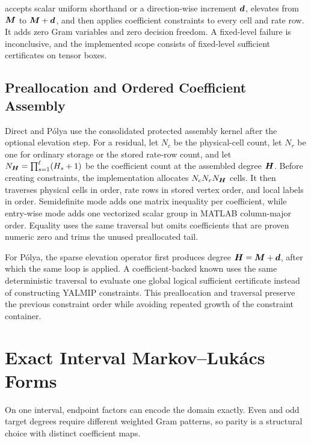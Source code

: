  accepts scalar uniform shorthand or a direction-wise increment $\boldsymbol{d}$, elevates from $\boldsymbol{M}$ to $\boldsymbol{M}+\boldsymbol{d}$, and then applies coefficient constraints to every cell and rate row. It adds zero Gram variables and zero decision freedom. A fixed-level failure is inconclusive, and the implemented scope consists of fixed-level sufficient certificates on tensor boxes.

\subsection{Preallocation and Ordered Coefficient Assembly}

Direct and P\'olya use the consolidated protected  assembly kernel after the optional elevation step. For a  residual, let $N_c$ be the physical-cell count, let $N_r$ be one for ordinary storage or the stored rate-row count, and let $N_{\boldsymbol{H}}=\prod_{s=1}^{\ell}(H_s+1)$ be the coefficient count at the assembled degree $\boldsymbol{H}$. Before creating constraints, the implementation allocates $N_cN_rN_{\boldsymbol{H}}$ cells. It then traverses physical cells in  order, rate rows in stored vertex order, and local labels in  order. Semidefinite mode adds one matrix inequality per coefficient, while entry-wise mode adds one vectorized scalar group in MATLAB column-major order. Equality uses the same traversal but omits coefficients that are proven numeric zero and trims the unused preallocated tail.

For P\'olya, the sparse elevation operator first produces degree $\boldsymbol{H}=\boldsymbol{M}+\boldsymbol{d}$, after which the same loop is applied. A coefficient-backed known  uses the same deterministic traversal to evaluate one global logical sufficient certificate instead of constructing YALMIP constraints. This preallocation and traversal preserve the previous constraint order while avoiding repeated growth of the constraint container.

\section{Exact Interval Markov--Luk\'acs Forms}
\label{sec:certificate-markov-lukacs}

On one interval, endpoint factors can encode the domain exactly. Even and odd target degrees require different weighted Gram patterns, so parity is a structural choice with distinct coefficient maps.

